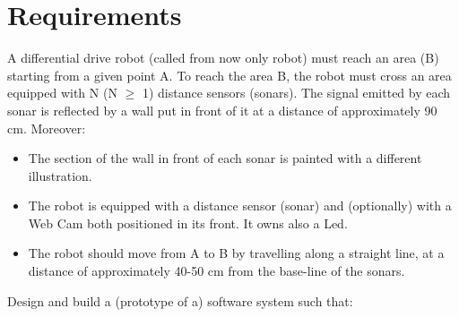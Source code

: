 \documentclass[a4paper]{article}
\begin{document}
\section{Requirements }

A differential drive robot (called from now only robot) must reach an area (B) starting from a given point A. To reach the area B, the robot must cross an area equipped with N (N $\geq$ 1) distance sensors (sonars). The signal emitted by each sonar is reflected by a wall put in front of it at a distance of approximately 90 cm.
Moreover:
\begin{itemize}
	\item The section of the wall in front of each sonar is painted with a different illustration.
	\item The robot is equipped with a distance sensor (sonar) and (optionally) with a Web Cam both positioned in its front. It owns also a Led.
	\item The robot should move from A to B by travelling along a straight line, at a distance of approximately 40-50 cm from the base-line of the sonars.
\end{itemize}
Design and build a (prototype of a) software system such that:
\end{document}
